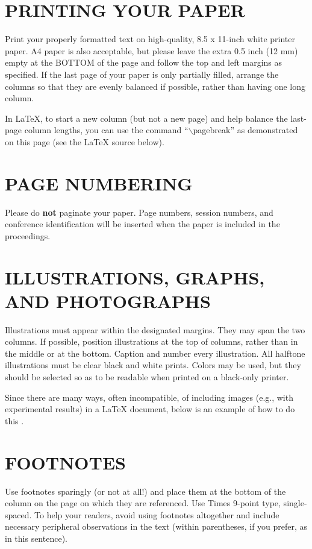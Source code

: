 \documentclass{article}
\begin{document}
\section{PRINTING YOUR PAPER}
\label{sec:print}

Print your properly formatted text on high-quality, 8.5 x 11-inch white printer
paper. A4 paper is also acceptable, but please leave the extra 0.5 inch (12 mm)
empty at the BOTTOM of the page and follow the top and left margins as
specified.  If the last page of your paper is only partially filled, arrange
the columns so that they are evenly balanced if possible, rather than having
one long column.

In LaTeX, to start a new column (but not a new page) and help balance the
last-page column lengths, you can use the command ``$\backslash$pagebreak'' as
demonstrated on this page (see the LaTeX source below).

\section{PAGE NUMBERING}
\label{sec:page}

Please do {\bf not} paginate your paper.  Page numbers, session numbers, and
conference identification will be inserted when the paper is included in the
proceedings.

\section{ILLUSTRATIONS, GRAPHS, AND PHOTOGRAPHS}
\label{sec:illust}

Illustrations must appear within the designated margins.  They may span the two
columns.  If possible, position illustrations at the top of columns, rather
than in the middle or at the bottom.  Caption and number every illustration.
All halftone illustrations must be clear black and white prints.  Colors may be
used, but they should be selected so as to be readable when printed on a
black-only printer.

Since there are many ways, often incompatible, of including images (e.g., with
experimental results) in a LaTeX document, below is an example of how to do
this \cite{Lamp86}.

\section{FOOTNOTES}
\label{sec:foot}

Use footnotes sparingly (or not at all!) and place them at the bottom of the
column on the page on which they are referenced. Use Times 9-point type,
single-spaced. To help your readers, avoid using footnotes altogether and
include necessary peripheral observations in the text (within parentheses, if
you prefer, as in this sentence).
\end{document}
